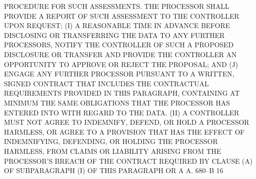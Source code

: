  PROCEDURE FOR SUCH ASSESSMENTS. THE PROCESSOR SHALL PROVIDE A REPORT  OF
 SUCH ASSESSMENT TO THE CONTROLLER UPON REQUEST;
   (I) A REASONABLE TIME IN ADVANCE BEFORE DISCLOSING OR TRANSFERRING THE
 DATA TO ANY FURTHER PROCESSORS, NOTIFY THE CONTROLLER OF SUCH A PROPOSED
 DISCLOSURE  OR  TRANSFER  AND  PROVIDE  THE CONTROLLER AN OPPORTUNITY TO
 APPROVE OR REJECT THE PROPOSAL; AND
   (J) ENGAGE  ANY  FURTHER  PROCESSOR  PURSUANT  TO  A  WRITTEN,  SIGNED
 CONTRACT  THAT  INCLUDES  THE  CONTRACTUAL REQUIREMENTS PROVIDED IN THIS
 PARAGRAPH, CONTAINING AT MINIMUM THE SAME OBLIGATIONS THAT THE PROCESSOR
 HAS ENTERED INTO WITH REGARD TO THE DATA.
   (II) A CONTROLLER MUST NOT AGREE  TO  INDEMNIFY,  DEFEND,  OR  HOLD  A
 PROCESSOR  HARMLESS,  OR  AGREE  TO  A  PROVISION THAT HAS THE EFFECT OF
 INDEMNIFYING, DEFENDING, OR HOLDING THE PROCESSOR HARMLESS, FROM  CLAIMS
 OR  LIABILITY  ARISING  FROM  THE  PROCESSOR'S  BREACH  OF  THE CONTRACT
 REQUIRED BY CLAUSE (A) OF  SUBPARAGRAPH  (I)  OF  THIS  PARAGRAPH  OR  A
 A. 680--B                          16
 
